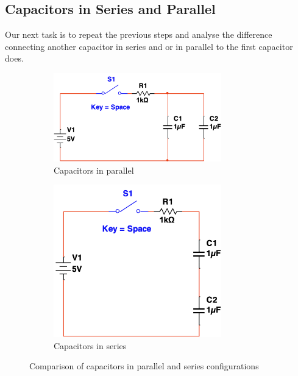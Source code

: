 \documentclass[a4paper, 10pt]{article}
\begin{document}
					\subsection{Capacitors in Series and Parallel}
							
						Our next task is to repeat the previous steps and analyse the difference connecting another capacitor in series and or in parallel to the first capacitor does.

						\begin{figure}[h!]
							\begin{subfigure}[b]{0.45\textwidth}
								\centering
								\includegraphics[width=0.8\textwidth]{./images/Capacitors_Parallel_Circuit.png}
								\caption{Capacitors in parallel}
								\label{fig:capacitors_in_parallel_circuit}
							\end{subfigure}
							\hspace*{0.1\textwidth}
							\begin{subfigure}[b]{0.45\textwidth}
								\centering
								\includegraphics[width=0.8\textwidth]{./images/Capacitors_Series_Circuit.png}
								\caption{Capacitors in series}
								\label{fig:capacitors_in_series_circuit}
							\end{subfigure}
							\caption{Comparison of capacitors in parallel and series configurations}
							\label{fig:capacitors_configurations}
						\end{figure}
					
\end{document}
